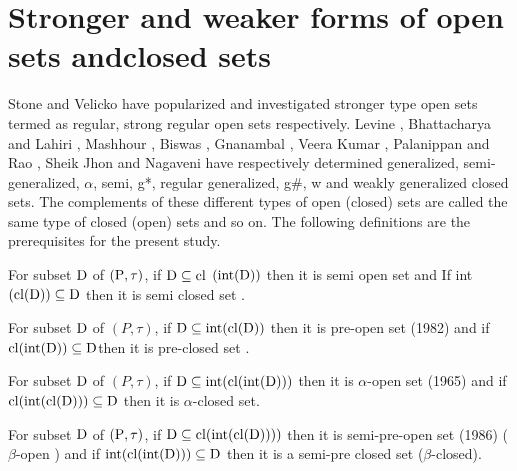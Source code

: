 \section[Stronger and weaker forms of open sets and closed sets]{Stronger and weaker forms of open sets and\break closed sets}\label{sec1.2}

Stone \cite{Stone} and Velicko \cite{Velicko} have popularized and investigated stronger type open sets termed as regular, strong regular open sets respectively. Levine \cite{Levine}, Bhattacharya and Lahiri \cite{Bhattacharya}, Mashhour \cite{abd}, Biswas \cite{Biswas}, Gnanambal \cite{Gnanambal}, Veera Kumar \cite{Veerakumar}, Palanippan and Rao \cite{Palaniappan}, Sheik Jhon \cite{Sheik} and Nagaveni \cite{Nagaveni} have respectively determined generalized, semi-generalized, $\alpha$, semi, g*, regular generalized, g\#, w and weakly generalized closed sets. The complements of these different types of open (closed) sets are called the same type of closed (open) sets and so on. The following definitions are the prerequisites for the present study.

\begin{dfn}\label{dfn1.2.1}
For subset $\mathrm{D}$ of $(\mathrm{P}, \tau)$, if $\mathrm{D} \subseteq \mathrm{cl}$ $(\mbox{int} (\mathrm{D}))$ then it is semi open set and If int $(\mathrm{cl}(\mathrm{D})) \subseteq \mathrm{D}$ then it is semi closed set \cite{Levine1}.
\end{dfn}

\begin{dfn}\label{dfn1.2.2}
For subset $\mathrm{D}$ of $(P, \tau)$, if $\mathrm{D} \subseteq \mbox{int}(\mathrm{cl}(\mathrm{D}))$ then it is pre-open set (1982) and if $\mathrm{cl}(\mbox{int}(\mathrm{D})) \subseteq \mathrm{D}$then it is pre-closed set \cite{Arya1}. 
\end{dfn}

\begin{dfn}\label{dfn1.2.3}
For subset $\mathrm{D}$ of $(P, \tau)$, if $\mathrm{D} \subseteq\mbox{int} (\mathrm{cl}(\mbox{int}(\mathrm{D})))$ then it is $\alpha$-open set \cite{Njastad} (1965) and if $\mathrm{cl}(\mbox{int}(\mathrm{cl}(\mathrm{D})))\subseteq \mathrm{D}$ then it is $\alpha$-closed set.
\end{dfn}

\begin{dfn}\label{dfn1.2.4}
For subset $\mathrm{D}$ of $(\mathrm{P}, \tau)$, if $\mathrm{D} \subseteq \mathrm{cl}(\mbox{int}(\mathrm{cl}(\mathrm{D}))))$ then it is semi-pre-open set (1986) ($\beta$-open \cite{abd}) and if $\mbox{int}(\mathrm{cl}(\mbox{int}(\mathrm{D}))) \subseteq \mathrm{D}$ then it is a semi-pre closed set ($\beta$-closed). 
\end{dfn}

